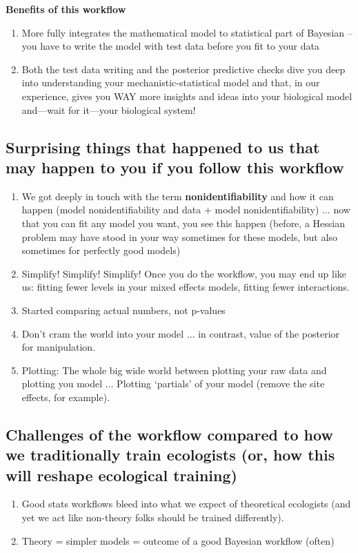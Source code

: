 \documentclass[11pt]{article}
\begin{document}
{\bf Benefits of this workflow}

\begin{enumerate}
\item More fully integrates the mathematical model to statistical part of Bayesian -- you have to write the model with test data before you fit to your data
\item Both the test data writing and the posterior predictive checks dive you deep into understanding your mechanistic-statistical model and that, in our experience, gives you WAY more insights and ideas into your biological model and---wait for it---your biological system!
\end{enumerate}


\subsection{Surprising things that happened to us that may happen to you if you follow this workflow}

\begin{enumerate}
\item We got deeply in touch with the term {\bf nonidentifiability} and how it can happen (model nonidentifiability and data + model nonidentifiability) ... now that you can fit any model you want, you see this happen (before, a Hessian problem may have stood in your way sometimes for these models, but also sometimes for perfectly good models)
\item Simplify! Simplify! Simplify! Once you do the workflow, you may end up like us: fitting fewer levels in your mixed effects models, fitting fewer interactions.
\item Started comparing actual numbers, not p-values
\item Don't cram the world into your model ... in contrast, value of the posterior for manipulation. 
\item Plotting: The whole big wide world between plotting your raw data and plotting you model ... Plotting `partials' of your model (remove the site effects, for example).
\end{enumerate}

\subsection{Challenges of the workflow compared to how we traditionally train ecologists (or, how this will reshape ecological training)}

\begin{enumerate}
\item Good stats workflows bleed into what we expect of theoretical ecologists (and yet we act like non-theory folks should be trained differently). 
\item Theory = simpler models = outcome of a good Bayesian workflow (often)
\end{enumerate}
\end{document}

